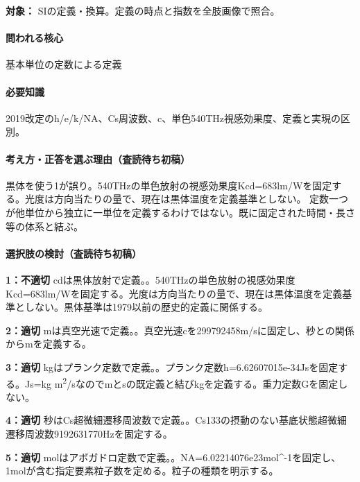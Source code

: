 \noindent\textbf{対象：} SIの定義・換算。定義の時点と指数を全肢画像で照合。\par

\paragraph{問われる核心} 基本単位の定数による定義

\paragraph{必要知識} 2019改定のh/e/k/NA、Cs周波数、c、単色540THz視感効果度、定義と実現の区別。

\paragraph{考え方・正答を選ぶ理由（査読待ち初稿）} 黒体を使う1が誤り。540THzの単色放射の視感効果度Kcd=\allowbreak{}683lm/Wを固定する。光度は方向当たりの量で、現在は黒体温度を定義基準としない。 定数一つが他単位から独立に一単位を定義するわけではない。既に固定された時間・長さ等の体系と結ぶ。

\paragraph{選択肢の検討（査読待ち初稿）}\mbox{}\par

\noindent\textbf{1：不適切} cdは黒体放射で定義。。540THzの単色放射の視感効果度Kcd=\allowbreak{}683lm/Wを固定する。光度は方向当たりの量で、現在は黒体温度を定義基準としない。黒体基準は1979以前の歴史的定義に関係する。\par

\noindent\textbf{2：適切} mは真空光速で定義。。真空光速cを299792458m/sに固定し、秒との関係からmを定義する。\par

\noindent\textbf{3：適切} kgはプランク定数で定義。。プランク定数h=\allowbreak{}6.62607015e-34Jsを固定する。Js=\allowbreak{}kg m\textsuperscript{2}/sなのでmとsの既定義と結びkgを定義する。重力定数Gを固定しない。\par

\noindent\textbf{4：適切} 秒はCs超微細遷移周波数で定義。。Cs133の摂動のない基底状態超微細遷移周波数9192631770Hzを固定する。\par

\noindent\textbf{5：適切} molはアボガドロ定数で定義。。NA=\allowbreak{}6.02214076e23mol\textasciicircum{}-1を固定し、1molが含む指定要素粒子数を定める。粒子の種類を明示する。\par

